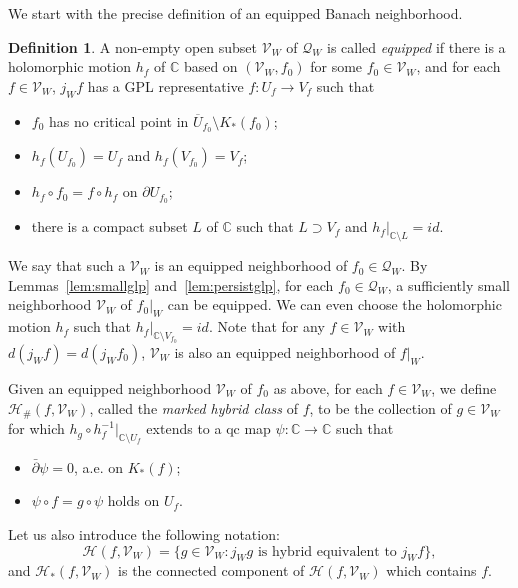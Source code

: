 \documentclass{amsart}
\numberwithin{equation}{section}
\newcommand{\C}{\mathbb C}
\theoremstyle{definition}
\newtheorem{definition}[theorem]{Definition}%
\theoremstyle{remark}
\begin{document}
We start with the precise definition of an equipped Banach neighborhood. 
\begin{definition}\label{dfn:equipped}
A non-empty open subset $\mathcal{V}_W$ of $\mathcal{Q}_W$ is called {\em equipped} if there is a holomorphic motion $h_f$ of $\C$ based on $(\mathcal{V}_W, f_0)$ for some $f_0\in \mathcal{V}_W$, and for each $f\in \mathcal{V}_W$, $j_Wf$ has a GPL representative $f: U_f\to V_f$ such that 
\begin{itemize}
\item $f_0$ has no critical point in $\overline{U}_{f_0}\setminus K_*(f_0)$;
\item $h_f(U_{f_0})=U_f$ and $h_f(V_{f_0})=V_f$;
\item $h_f\circ f_0=f\circ h_f$ on $\partial U_{f_0}$;
\item there is a compact subset $L$ of $\C$ such that $L\supset V_f$ and $h_f|_{\C\setminus L}=id$.
\end{itemize}   
\end{definition}
We say that such a $\mathcal{V}_W$ is an equipped neighborhood of $f_0\in \mathcal{Q}_W$. 
By Lemmas~\ref{lem:smallglp} and~\ref{lem:persistglp}, for each $f_0\in \mathcal{Q}_W$, a sufficiently small neighborhood $\mathcal{V}_{W}$ of $f_0|_{W}$ can be equipped. We can even choose the holomorphic motion $h_f$ such that $h_f|_{\C\setminus V_{f_0}}=id$. 
Note that for any $f\in \mathcal{V}_{W}$ with $d(j_Wf)=d(j_W f_0)$,
$\mathcal{V}_W$ is also an equipped neighborhood of $f|_W$. 

Given an equipped neighborhood $\mathcal{V}_W$ of $f_0$ as above, for each $f\in \mathcal{V}_W$, we define $\mathcal{H}_\#(f, \mathcal{V}_W)$, called the {\em marked hybrid class} of $f$, to be the collection of $g\in \mathcal{V}_W$ for which $h_g\circ h_{f}^{-1}|_{\C\setminus U_{f}}$ extends to a qc map $\psi:\mathbb{C}\to\mathbb{C}$ such that 
\begin{itemize}
\item $\bar{\partial} \psi=0$, a.e. on $K_*(f)$;
\item $\psi\circ f=g\circ \psi$ holds on $U_{f}$. 
\end{itemize}

Let us also introduce the following notation:
$$\mathcal{H}(f,\mathcal{V}_W)=\{g\in \mathcal{V}_W: j_Wg \mbox{ is hybrid equivalent to } j_Wf\},$$
and $\mathcal{H}_*(f,\mathcal{V}_W)$ is the connected component of $\mathcal{H}(f,\mathcal{V}_W)$ which contains $f$. 
\end{document}
